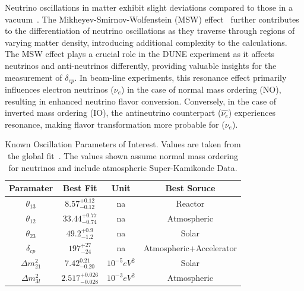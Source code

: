 Neutrino oscillations in matter exhibit slight deviations compared to those in a vacuum~\citep{PhysRevD.17.2369}.
The Mikheyev-Smirnov-Wolfenstein (MSW) effect~\citep{Smirnov2004TheME} further contributes to the differentiation of neutrino oscillations as they traverse through regions of varying matter density, introducing additional complexity to the calculations.
The MSW effect plays a crucial role in the DUNE experiment as it affects neutrinos and anti-neutrinos differently, providing valuable insights for the measurement of $\delta_{cp}$.
In beam-line experiments, this resonance effect primarily influences electron neutrinos ($\nu_{e}$) in the case of normal mass ordering (NO), resulting in enhanced neutrino flavor conversion.
Conversely, in the case of inverted mass ordering (IO), the antineutrino counterpart ($\hat{\nu_{e}}$) experiences resonance, making flavor transformation more probable for ($\nu_{e}$).
\begin{table}
\begin{center}
\begin{tabular}{||c c c c||}
 \hline
 Paramater & Best Fit & Unit & Best Soruce\\ [0.5ex]
 \hline\hline
  $\theta_{13}$ & $8.57^{+0.12}_{-0.12}$ & na & Reactor \\ %
 \hline
  $\theta_{12}$ & $33.44^{+0.77}_{-0.74}$ & na & Atmospheric \\ %
 \hline
  $\theta_{23}$ & $49.2^{+0.9}_{-1.2}$ & na & Solar \\ %
 \hline
  $\delta_{cp}$ & $197^{+27}_{-24}$ & na & Atmospheric+Accelerator \\ %
 \hline
  $\Delta m_{21}^{2}$ & $7.42^{0.21}_{-0.20}$ & $10^{-5}eV^{2}$ & Solar \\ %
 \hline
  $\Delta m_{3l}^{2}$ & $2.517^{+0.026}_{-0.028}$ & $10^{-3}eV^{2}$ & Atmospheric  \\
 \hline
\end{tabular}
\caption{Known Oscillation Parameters of Interest.
Values are taken from the global fit~\citep{2020JHEP...09..178E}.
The values shown assume normal mass ordering for neutrinos and include atmospheric Super-Kamikonde Data.
}
\label{table:pmns_params}
\end{center}
\end{table}


